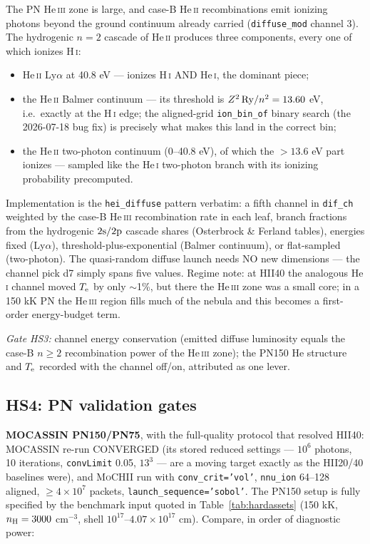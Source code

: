 \documentclass[english,a4paper]{my_memo}
\newcommand{\code}[1]{\texttt{#1}}
\newcommand{\MoCHII}{\textsc{MoCHII}}
\newcommand{\HI}{H\,\textsc{i}}
\newcommand{\HeI}{He\,\textsc{i}}
\newcommand{\HeII}{He\,\textsc{ii}}
\newcommand{\HeIII}{He\,\textsc{iii}}
\newcommand{\Te}{T_{\rm e}}
\begin{document}
The PN \HeIII{} zone is large, and case-B \HeII{} recombinations emit
ionizing photons beyond the ground continuum already carried
(\code{diffuse\_mod} channel 3).  The hydrogenic $n=2$ cascade of
\HeII{} produces three components, every one of which ionizes \HI{}:

\begin{itemize}[leftmargin=2em]
\item \HeII{} Ly$\alpha$ at 40.8 eV --- ionizes \HI{} AND \HeI{}, the
  dominant piece;
\item the \HeII{} Balmer continuum --- its threshold is
  $Z^2\,{\rm Ry}/n^2 = 13.60$ eV, i.e.\ exactly at the \HI{} edge; the
  aligned-grid \code{ion\_bin\_of} binary search (the 2026-07-18 bug
  fix) is precisely what makes this land in the correct bin;
\item the \HeII{} two-photon continuum (0--40.8 eV), of which the
  $>13.6$ eV part ionizes --- sampled like the \HeI{} two-photon branch
  with its ionizing probability precomputed.
\end{itemize}

Implementation is the \code{hei\_diffuse} pattern verbatim: a fifth
channel in \code{dif\_ch} weighted by the case-B \HeIII{}
recombination rate in each leaf, branch fractions from the hydrogenic
$2{\rm s}/2{\rm p}$ cascade shares (Osterbrock \& Ferland tables),
energies fixed (Ly$\alpha$), threshold-plus-exponential (Balmer
continuum), or flat-sampled (two-photon).  The quasi-random diffuse
launch needs NO new dimensions --- the channel pick d7 simply spans
five values.  Regime note: at HII40 the analogous \HeI{} channel moved
$\Te$ by only $\sim$1\%, but there the \HeIII{} zone was a small core;
in a 150 kK PN the \HeIII{} region fills much of the nebula and this
becomes a first-order energy-budget term.

\emph{Gate HS3:} channel energy conservation (emitted diffuse
luminosity equals the case-B $n\geq2$ recombination power of the
\HeIII{} zone); the PN150 He structure and $\Te$ recorded with the
channel off/on, attributed as one lever.

\subsection{HS4: PN validation gates}

\textbf{MOCASSIN PN150/PN75}, with the full-quality protocol that
resolved HII40: MOCASSIN re-run CONVERGED (its stored reduced settings
--- $10^6$ photons, 10 iterations, \code{convLimit} 0.05, $13^3$ ---
are a moving target exactly as the HII20/40 baselines were), and
\MoCHII{} run with \code{conv\_crit='vol'}, \code{nnu\_ion} 64--128
aligned, $\geq4\times10^7$ packets, \code{launch\_sequence='sobol'}.
The PN150 setup is fully specified by the benchmark input quoted in
Table~\ref{tab:hardassets} (150 kK, $n_{\rm H}=3000$ cm$^{-3}$, shell
$10^{17}$--$4.07\times10^{17}$ cm).  Compare, in order of diagnostic
power:
\end{document}
